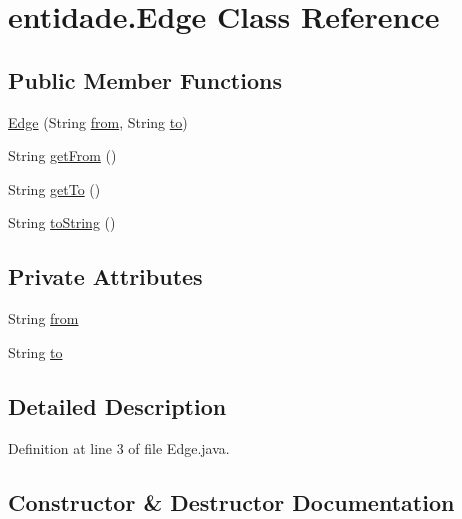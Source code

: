 \hypertarget{classentidade_1_1Edge}{}\section{entidade.\+Edge Class Reference}
\label{classentidade_1_1Edge}
\subsection*{Public Member Functions}
\begin{DoxyCompactItemize}
\item 
\hyperlink{classentidade_1_1Edge_a311a540258bdd9f8762a7ce29c6974de}{Edge} (String \hyperlink{classentidade_1_1Edge_a07aaa9aa9967df0794ebc3f18e3e97d9}{from}, String \hyperlink{classentidade_1_1Edge_a642c55ff920cf29678aa54b15ee52f9f}{to})
\item 
String \hyperlink{classentidade_1_1Edge_aa6fdf62a95dc0c9d25b61abfd832041b}{get\+From} ()
\item 
String \hyperlink{classentidade_1_1Edge_aa068ecd10ba33f29120b7b935a44c488}{get\+To} ()
\item 
String \hyperlink{classentidade_1_1Edge_a584386c6625287aa683413263db3de3a}{to\+String} ()
\end{DoxyCompactItemize}
\subsection*{Private Attributes}
\begin{DoxyCompactItemize}
\item 
String \hyperlink{classentidade_1_1Edge_a07aaa9aa9967df0794ebc3f18e3e97d9}{from}
\item 
String \hyperlink{classentidade_1_1Edge_a642c55ff920cf29678aa54b15ee52f9f}{to}
\end{DoxyCompactItemize}


\subsection{Detailed Description}


Definition at line 3 of file Edge.\+java.



\subsection{Constructor \& Destructor Documentation}
\hypertarget{classentidade_1_1Edge_a311a540258bdd9f8762a7ce29c6974de}{}\label{classentidade_1_1Edge_a311a540258bdd9f8762a7ce29c6974de} 
